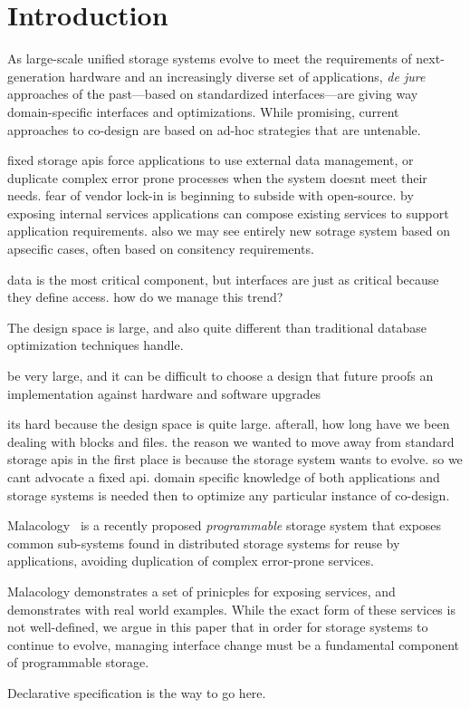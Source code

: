 \section{Introduction}
\label{sec:intro}

As large-scale unified storage systems evolve to meet the requirements of
next-generation hardware and an increasingly diverse set of applications,
\emph{de jure} approaches of the past---based on standardized interfaces---are
giving way domain-specific interfaces and optimizations. While promising,
current approaches to co-design are based on ad-hoc strategies that are
untenable.


fixed storage apis force applications to use external data management, or
duplicate complex error prone processes when the system doesnt meet their
needs. fear of vendor lock-in is beginning to subside with open-source.  by
exposing internal services applications can compose existing services to
support application requirements.  also we may see entirely new sotrage system
based on apsecific cases, often based on consitency requirements.

data is the most critical component, but interfaces are just as critical
because they define access. how do we manage this trend?


The design space is large, and also quite different than traditional database
optimization techniques handle.

be very large, and it can be difficult to choose a design that future proofs an
implementation against hardware and software upgrades




its hard because the design space is quite large. afterall, how long have we
been dealing with blocks and files.
the reason we wanted to move away from standard storage apis in the first
place is because the storage system wants to evolve. so we cant advocate a
fixed api. domain specific knowledge of both applications and storage
systems is needed then to optimize any particular instance of co-design.

Malacology~\cite{sevilla:eurosys17} is a recently proposed \emph{programmable}
storage system that exposes common sub-systems found in distributed storage
systems for reuse by applications, avoiding duplication of complex error-prone
services.

Malacology demonstrates a set of prinicples for exposing services, and
demonstrates with real world examples. While the exact form of these services
is not well-defined, we argue in this paper that in order for storage systems
to continue to evolve, managing interface change must be a fundamental
component of programmable storage.

Declarative specification is the way to go here.

